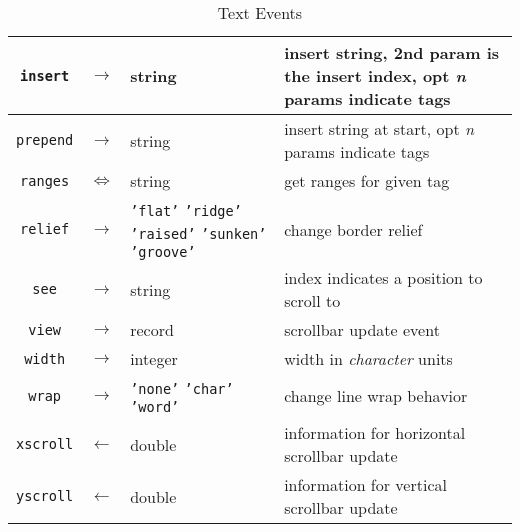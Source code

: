 \begin{table}[tbh]
{\begin{center}
\begin{tabular}{|c|c|p{0.6in}|p{3.3in}|}
{\tt insert}	&$\rightarrow$&string& insert string, 2nd param is the insert index, opt {\em n} params indicate tags \\ \hline
{\tt prepend}	&$\rightarrow$&string& insert string at start, opt {\em n} params indicate tags \\ \hline
{\tt ranges}	&$\Leftrightarrow$&string& get ranges for given tag \\ \hline
{\tt relief}	&$\rightarrow$& {\tt 'flat'} {\tt 'ridge'} {\tt 'raised'} {\tt 'sunken'} {\tt 'groove'} & change border relief \\ \hline
{\tt see}	&$\rightarrow$&string& index indicates a position to scroll to \\ \hline
{\tt view}	&$\rightarrow$&record& scrollbar update event \\ \hline
{\tt width}	&$\rightarrow$&integer& width in {\em character} units \\ \hline
{\tt wrap}	&$\rightarrow$& {\tt 'none'} {\tt 'char'} {\tt 'word'} & change line wrap behavior \\ \hline
{\tt xscroll}	&$\leftarrow$&double& information for horizontal scrollbar update \\ \hline
{\tt yscroll}	&$\leftarrow$&double& information for vertical scrollbar update \\ \hline
\end{tabular}
\end{center}
}
\caption{ Text Events }
\label{tktext-events}
\end{table}
\FloatBarrier

